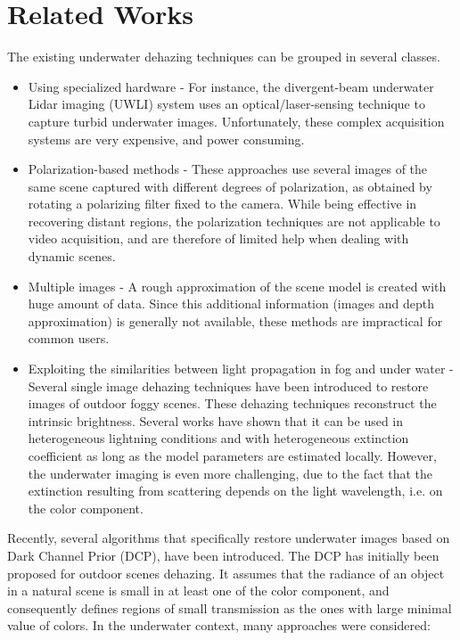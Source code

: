\documentclass[hidelinks, 12pt]{report}
\begin{document}
\section{Related Works}
\justify
The existing underwater dehazing techniques can be grouped in several classes. 
\begin{itemize}
\item{Using specialized hardware\cite{md} - For instance, the divergent-beam underwater Lidar imaging (UWLI) system uses an optical/laser-sensing technique to capture turbid underwater images. Unfortunately, these complex acquisition systems are very expensive, and power consuming.}
\item{Polarization-based methods - These approaches use several images of the same scene captured with different degrees of polarization, as obtained by rotating a polarizing filter fixed to the camera. While being effective in recovering distant regions, the polarization techniques are not applicable to video acquisition, and are therefore of limited help when dealing with dynamic scenes.}
\item{Multiple images - A rough approximation of the scene model is created with huge amount of data. Since this additional information (images and depth approximation) is generally not available, these methods are impractical for common users.}
\item{Exploiting the similarities between light propagation in fog and under water - Several single image dehazing techniques have been introduced to restore images of outdoor foggy scenes. These dehazing techniques reconstruct the intrinsic brightness. Several works have shown that it can be used in heterogeneous lightning conditions and with heterogeneous extinction coefficient as long as the model parameters are estimated locally\cite{n8}. However, the underwater imaging is even more challenging, due to the fact that the extinction resulting from scattering depends on the light wavelength, i.e. on the color component.}
\end{itemize}
Recently, several algorithms that specifically restore underwater images based on Dark Channel Prior (DCP)\cite{khe}, have been introduced. The DCP has initially been proposed for outdoor scenes dehazing. It assumes that the radiance of an object in a natural scene is small in at least one of the color component, and consequently defines regions of small transmission as the ones with large minimal value of colors. In the underwater context, many approaches were considered:
\end{document}
